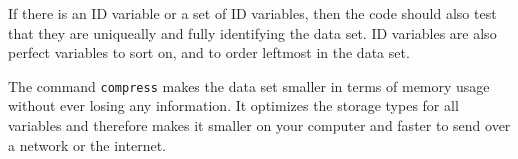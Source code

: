 If there is an ID variable or a set of ID variables, then the code should also test that they are uniqueally and
fully identifying the data set. ID
variables are also perfect variables to sort on, and to order leftmost in the data set.

The command \texttt{compress} makes the data set smaller in terms of memory usage without ever losing any
information. It optimizes the storage types for all variables and therefore makes it smaller on your computer
and faster to send over a network or the internet.



\mainmatter
